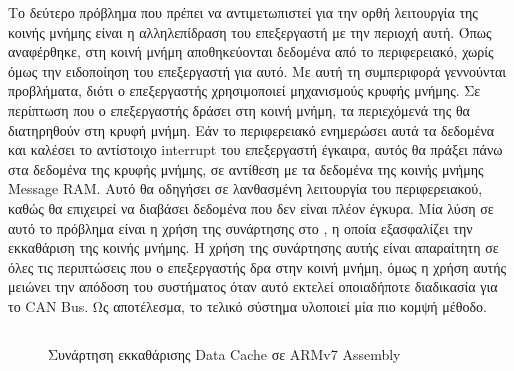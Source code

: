 \documentclass[a4paper,nobib,justified]{tufte-book}
\begin{document}
Το δεύτερο πρόβλημα που πρέπει να αντιμετωπιστεί για την ορθή λειτουργία της κοινής μνήμης είναι η αλληλεπίδραση του επεξεργαστή με την περιοχή αυτή. Όπως αναφέρθηκε, στη κοινή μνήμη αποθηκεύονται δεδομένα από το περιφερειακό, χωρίς όμως την ειδοποίηση του επεξεργαστή για αυτό. Με αυτή τη συμπεριφορά γεννούνται προβλήματα, διότι ο επεξεργαστής χρησιμοποιεί μηχανισμούς κρυφής μνήμης. Σε περίπτωση που ο επεξεργαστής δράσει στη κοινή μνήμη, τα περιεχόμενά της θα διατηρηθούν στη κρυφή μνήμη. Εάν το περιφερειακό ενημερώσει αυτά τα δεδομένα και καλέσει το αντίστοιχο interrupt του επεξεργαστή έγκαιρα, αυτός θα πράξει πάνω στα δεδομένα της κρυφής μνήμης, σε αντίθεση με τα δεδομένα της κοινής μνήμης Message RAM. Αυτό θα οδηγήσει σε λανθασμένη λειτουργία του περιφερειακού, καθώς θα επιχειρεί να διαβάσει δεδομένα που δεν είναι πλέον έγκυρα. Μία λύση σε αυτό το πρόβλημα είναι η χρήση της συνάρτησης στο , η οποία εξασφαλίζει την εκκαθάριση της κοινής μνήμης. Η χρήση της συνάρτησης αυτής είναι απαραίτητη σε όλες τις περιπτώσεις που ο επεξεργαστής δρα στην κοινή μνήμη, όμως η χρήση αυτής μειώνει την απόδοση του συστήματος όταν αυτό εκτελεί οποιαδήποτε διαδικασία για το CAN Bus. Ως αποτέλεσμα, το τελικό σύστημα υλοποιεί μία πιο κομψή μέθοδο.

\begin{figure}
	\inputminted{asm}{code/examples/cache-clean-routine.asm}
	\label{code:cache-clean-routine}
	\caption[Συνάρτηση εκκαθάρισης Data Cache]{Συνάρτηση εκκαθάρισης Data Cache σε ARMv7 Assembly}
\end{figure}
\end{document}
